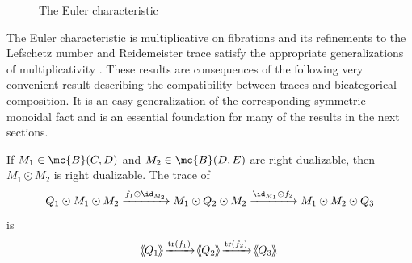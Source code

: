 \documentclass[11pt]{amsart}
\newcommand{\xto}{\xrightarrow}
\DeclareMathOperator{\tr}{tr}
\def\shvar#1#2{{\ensuremath{%
  \hspace{1mm}\makebox[-1mm]{$#1\langle$}\makebox[0mm]{$#1\langle$}\hspace{1mm}%
  {#2}%
  \makebox[1mm]{$#1\rangle$}\makebox[0mm]{$#1\rangle$}%
}}}
\def\sh{\shvar{}}
\begin{document}
\begin{figure}
\caption{The Euler characteristic}\label{fig:euler_char}
\end{figure}

The Euler characteristic is multiplicative on fibrations and its refinements to the Lefschetz number and Reidemeister trace satisfy the appropriate generalizations of multiplicativity \cite{ps:mult}.  These results are consequences of the following very convenient result describing the compatibility between traces and bicategorical composition. It is an easy generalization of the corresponding symmetric monoidal fact
and is an essential foundation for many of the results in the next sections.


\begin{thm} \cite[16.5.1]{maysig:pht}\cite[Prop.~7.5]{ps:bicat} \label{lem:composite_dual_pair}
If $M_1\in \mc{B}(C,D)$ and $M_2\in \mc{B}(D,E)$ are right dualizable, then $M_1\odot M_2$ is right dualizable.  The trace of 
\[
  Q_1\odot M_1\odot M_2\xto{f_1\odot \id_{M_2}}
  M_1\odot Q_2\odot M_2\xto{\id_{M_1}\odot f_2} M_1\odot M_2\odot Q_3
\] is 
\[
\sh{Q_1}\xto{\tr(f_1)}\sh{Q_2}\xto{\tr(f_2)}\sh{Q_3}.
\]
\end{thm}
\end{document}
